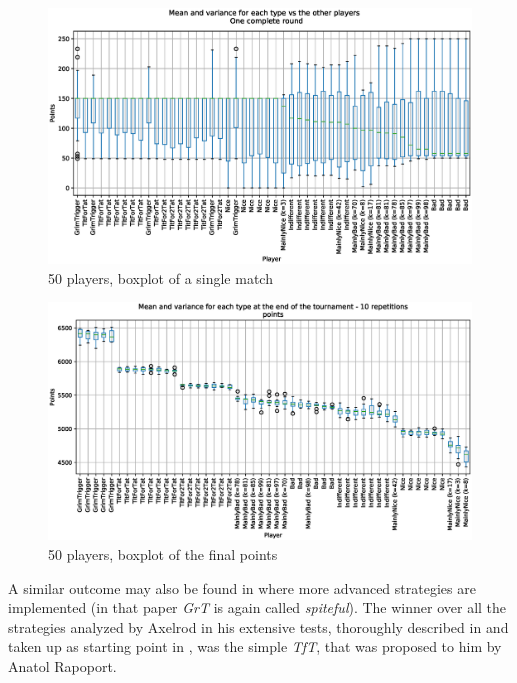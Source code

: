 \documentclass[journal,10pt,twoside]{IEEEtran}
\begin{document}
\begin{figure}[!ht]
    \centering
    \includegraphics[width=1\columnwidth]{../img/ipdmp/ipdmp-boxplot-single-match-50}
    \caption{50 players, boxplot of a single match}
    \label{fig:ipdmp50boxsingle}
\end{figure}

\begin{figure}[!ht]
    \centering
    \includegraphics[width=1\columnwidth]{../img/ipdmp/ipdmp-boxplot-final-points-50}
    \caption{50 players, boxplot of the final points}
    \label{fig:ipdmp50boxfinal}
\end{figure}

A similar outcome may also be found in \cite{mathieu2017} where more advanced strategies are implemented (in that paper \textit{GrT} is again called \textit{spiteful}).
The winner over all the strategies analyzed by Axelrod in his extensive tests, thoroughly described in \cite{axelrod1981evolution,axelrod1984evolution} and taken up as starting point in \cite{mathieu2017}, was the simple \textit{TfT}, that was proposed to him by Anatol Rapoport.
\end{document}
